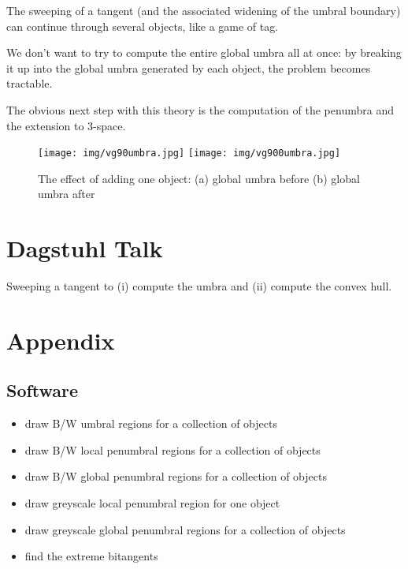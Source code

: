\documentclass[9pt,twocolumn]{article}
\begin{document}
The sweeping of a tangent (and the associated widening of the umbral boundary)
can continue through several objects, like a game of tag.

We don't want to try to compute the entire global umbra all at once:
by breaking it up into the global umbra generated by each object,
the problem becomes tractable.

The obvious next step with this theory is the computation of the penumbra
and the extension to 3-space.

\begin{figure}
\begin{center}
\texttt{[image: img/vg90umbra.jpg]}
\texttt{[image: img/vg900umbra.jpg]}
\end{center}
\caption{The effect of adding one object: (a) global umbra before (b) global umbra after}
\label{fig:scene2}
\end{figure}


\section{Dagstuhl Talk}

Sweeping a tangent to (i) compute the umbra and (ii) compute the convex hull.

\section{Appendix}
\label{sec:appendix}

\subsection{Software}

\begin{itemize}
\item draw B/W umbral regions for a collection of objects
\item draw B/W local penumbral regions for a collection of objects
\item draw B/W global penumbral regions for a collection of objects 
\item draw greyscale local penumbral region for one object
\item draw greyscale global penumbral regions for a collection of objects
\item find the extreme bitangents
\end{itemize}
\end{document}
